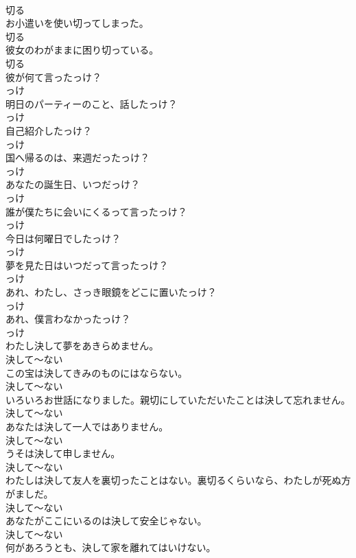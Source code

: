 \documentclass[8pt]{extreport}
\begin{document}
\begin{CJK}{UTF8}{min}
\\	切る
\\	お小遣いを使い切ってしまった。	
\\	切る
\\	彼女のわがままに困り切っている。	
\\	切る
\\	彼が何て言ったっけ？	
\\	っけ
\\	明日のパーティーのこと、話したっけ？	
\\	っけ
\\	自己紹介したっけ？	
\\	っけ
\\	国へ帰るのは、来週だったっけ？	
\\	っけ
\\	あなたの誕生日、いつだっけ？	
\\	っけ
\\	誰が僕たちに会いにくるって言ったっけ？	
\\	っけ
\\	今日は何曜日でしたっけ？	
\\	っけ
\\	夢を見た日はいつだって言ったっけ？	
\\	っけ
\\	あれ、わたし、さっき眼鏡をどこに置いたっけ？	
\\	っけ
\\	あれ、僕言わなかったっけ？	
\\	っけ
\\	わたし決して夢をあきらめません。	
\\	決して～ない
\\	この宝は決してきみのものにはならない。	
\\	決して～ない
\\	いろいろお世話になりました。親切にしていただいたことは決して忘れません。	
\\	決して～ない
\\	あなたは決して一人ではありません。	
\\	決して～ない
\\	うそは決して申しません。	
\\	決して～ない
\\	わたしは決して友人を裏切ったことはない。裏切るくらいなら、わたしが死ぬ方がましだ。	
\\	決して～ない
\\	あなたがここにいるのは決して安全じゃない。	
\\	決して～ない
\\	何があろうとも、決して家を離れてはいけない。	

\end{CJK}
\end{document}
